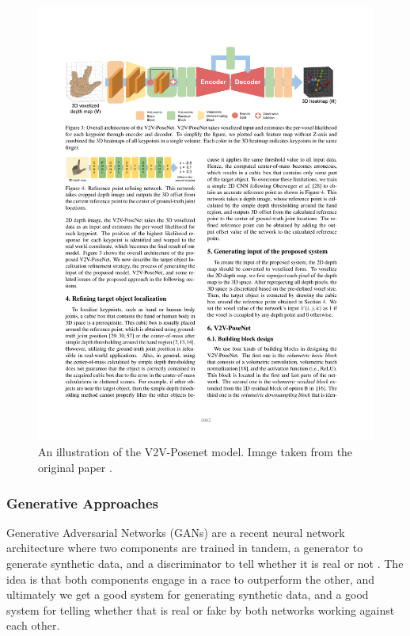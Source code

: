 \begin{figure}
    \includegraphics[width=\linewidth]{figs/general/v2v-posenet.pdf}
    \caption{An illustration of the V2V-Posenet model. Image taken from the original paper \cite{moon2018v2v}.}
    \label{fig:v2vposenet}
    \end{figure}

\subsubsection{Generative Approaches}
Generative Adversarial Networks (GANs) are a recent neural network architecture where two components are trained in tandem, a generator to generate synthetic data, and a discriminator to tell whether it is real or not \cite{karras2017progressive}. The idea is that both components engage in a race to outperform the other, and ultimately we get a good system for generating synthetic data, and a good system for telling whether that is real or fake by both networks working against each other.

